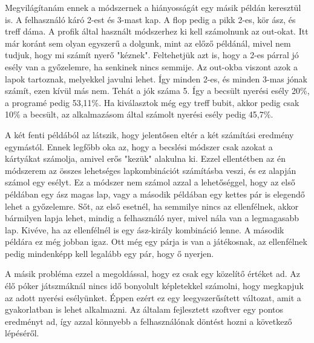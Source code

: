 Megvilágítanám ennek a módszernek a hiányosságát egy másik példán keresztül is. A felhasználó káró 2-est és 3-mast kap. A flop pedig a pikk 2-es, kör ász, és treff dáma. A profik által használt módszerhez ki kell számolnunk az out-okat. Itt már koránt sem olyan egyszerű a dolgunk, mint az előző példánál, mivel nem tudjuk, hogy mi számít nyerő "kéznek". Feltehetjük azt is, hogy a 2-es párral jó esély van a győzelemre, ha senkinek nincs semmije. Az out-okba viszont azok a lapok tartoznak, melyekkel javulni lehet. Így minden 2-es, és minden 3-mas jónak számít, ezen kívül más nem. Tehát a jók száma 5. Így a becsült nyerési esély 20\%, a programé pedig 53,11\%. Ha kiválasztok még egy treff bubit, akkor pedig csak 10\% a becsült, az alkalmazásom által számolt nyerési esély pedig 45,7\%.

A két fenti példából az látszik, hogy jelentősen eltér a két számítási eredmény egymástól. Ennek legfőbb oka az, hogy a becslési módszer csak azokat a kártyákat számolja, amivel erős "kezük" alakulna ki. Ezzel ellentétben az én módszerem az összes lehetséges lapkombinációt számításba veszi, és ez alapján számol egy esélyt. Ez a módszer nem számol azzal a lehetőséggel, hogy az első példában egy ász magas lap, vagy a második példában egy kettes pár is elegendő lehet a győzelemre. Sőt, az első esetnél, ha semmilye nincs az ellenfélnek, akkor bármilyen lapja lehet, mindig a felhasználó nyer, mivel nála van a legmagasabb lap. Kivéve, ha az ellenfélnél is egy ász-király kombináció lenne. A második példára ez még jobban igaz. Ott még egy párja is van a játékosnak, az ellenfélnek pedig mindenképp kell legalább egy pár, hogy ő nyerjen.

A másik probléma ezzel a megoldással, hogy ez csak egy közelítő értéket ad. Az élő póker játszmáknál nincs idő bonyolult képletekkel számolni, hogy megkapjuk az adott nyerési esélyünket. Éppen ezért ez egy leegyszerűsített változat, amit a gyakorlatban is lehet alkalmazni. Az általam fejlesztett szoftver egy pontos eredményt ad, így azzal könnyebb a felhasználónak döntést hozni a következő lépéséről.